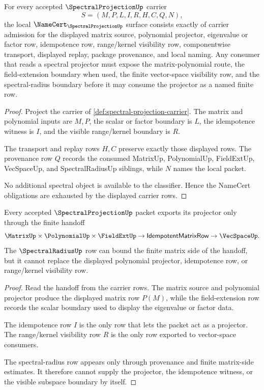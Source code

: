 \begin{theorem}
\label{thm:spectral-projection-namecert-obligations}
For every accepted $\SpectralProjectionUp$ carrier
$$
S=(M,P,L,I,R,H,C,Q,N),
$$
the local $\NameCert_{\SpectralProjectionUp}$ surface consists exactly of carrier admission for the displayed matrix source, polynomial projector, eigenvalue or factor row, idempotence row, range/kernel visibility row, componentwise transport, displayed replay, package provenance, and local naming. Any consumer that reads a spectral projector must expose the matrix-polynomial route, the field-extension boundary when used, the finite vector-space visibility row, and the spectral-radius boundary before it may consume the projector as a named finite row.
\end{theorem}
\begin{proof}
Project the carrier of \autoref{def:spectral-projection-carrier}. The matrix and polynomial inputs are $M,P$, the scalar or factor boundary is $L$, the idempotence witness is $I$, and the visible range/kernel boundary is $R$.

The transport and replay rows $H,C$ preserve exactly those displayed rows. The provenance row $Q$ records the consumed MatrixUp, PolynomialUp, FieldExtUp, VecSpaceUp, and SpectralRadiusUp siblings, while $N$ names the local packet.

No additional spectral object is available to the classifier. Hence the NameCert obligations are exhausted by the displayed carrier rows.
\end{proof}

\begin{theorem}
\label{thm:spectral-projection-matrix-polynomial-handoff}
Every accepted $\SpectralProjectionUp$ packet exports its projector only through the finite handoff
$$
\MatrixUp \times \PolynomialUp \times \FieldExtUp \to \mathsf{IdempotentMatrixRow} \to \VecSpaceUp.
$$
The $\SpectralRadiusUp$ row can bound the finite matrix side of the handoff, but it cannot replace the displayed polynomial projector, idempotence row, or range/kernel visibility row.
\end{theorem}
\begin{proof}
Read the handoff from the carrier rows. The matrix source and polynomial projector produce the displayed matrix row $P(M)$, while the field-extension row records the scalar boundary used to display the eigenvalue or factor data.

The idempotence row $I$ is the only row that lets the packet act as a projector. The range/kernel visibility row $R$ is the only row exported to vector-space consumers.

The spectral-radius row appears only through provenance and finite matrix-side estimates. It therefore cannot supply the projector, the idempotence witness, or the visible subspace boundary by itself.
\end{proof}

